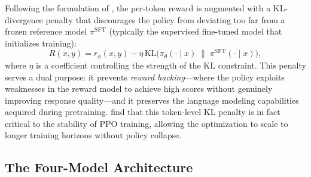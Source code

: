 Following the formulation of \cite{ouyang2022instructgpt}, the per-token reward is augmented with a KL-divergence penalty that discourages the policy from deviating too far from a frozen reference model $\pi^{\text{SFT}}$ (typically the supervised fine-tuned model that initializes training):
\begin{equation}
    \label{eq:rlhf_reward}
    R(x, y) = r_\phi(x, y) - \eta \, \text{KL}\!\big(\pi_\theta(\cdot \mid x) \;\|\; \pi^{\text{SFT}}(\cdot \mid x)\big),
\end{equation}
where $\eta$ is a coefficient controlling the strength of the KL constraint. This penalty serves a dual purpose: it prevents \emph{reward hacking}---where the policy exploits weaknesses in the reward model to achieve high scores without genuinely improving response quality---and it preserves the language modeling capabilities acquired during pretraining. \cite{zheng2023secrets} find that this token-level KL penalty is in fact critical to the stability of PPO training, allowing the optimization to scale to longer training horizons without policy collapse.

\subsection{The Four-Model Architecture}

